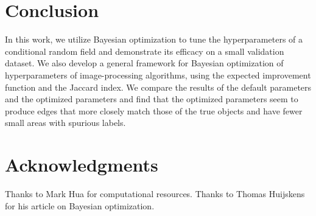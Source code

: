 \documentclass[10pt,twocolumn,letterpaper]{article}
\begin{document}
\section{Conclusion}

In this work, we utilize Bayesian optimization to tune the hyperparameters of a conditional random field and demonstrate its efficacy on a small validation dataset. We also develop a general framework for Bayesian optimization of hyperparameters of image-processing algorithms, using the expected improvement function and the Jaccard index. We compare the results of the default parameters and the optimized parameters and find that the optimized parameters seem to produce edges that more closely match those of the true objects and have fewer small areas with spurious labels.

\section*{Acknowledgments}
Thanks to Mark Hua for computational resources.
\newline\newline
Thanks to Thomas Huijskens for his article on Bayesian optimization.

{\small

}
\end{document}
